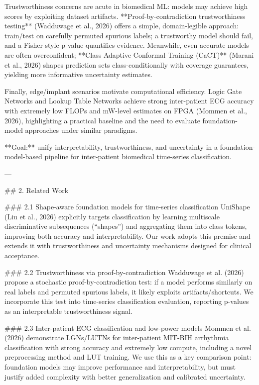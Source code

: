 Trustworthiness concerns are acute in biomedical ML: models may achieve high scores by exploiting dataset artifacts. **Proof-by-contradiction trustworthiness testing** (Wadduwage et al., 2026) offers a simple, domain-legible approach: train/test on carefully permuted spurious labels; a trustworthy model should fail, and a Fisher-style p-value quantifies evidence. Meanwhile, even accurate models are often overconfident; **Class Adaptive Conformal Training (CaCT)** (Marani et al., 2026) shapes prediction sets class-conditionally with coverage guarantees, yielding more informative uncertainty estimates.

Finally, edge/implant scenarios motivate computational efficiency. Logic Gate Networks and Lookup Table Networks achieve strong inter-patient ECG accuracy with extremely low FLOPs and mW-level estimates on FPGA (Mommen et al., 2026), highlighting a practical baseline and the need to evaluate foundation-model approaches under similar paradigms.

**Goal:** unify interpretability, trustworthiness, and uncertainty in a foundation-model-based pipeline for inter-patient biomedical time-series classification.

---

## 2. Related Work  

### 2.1 Shape-aware foundation models for time-series classification  
UniShape (Liu et al., 2026) explicitly targets classification by learning multiscale discriminative subsequences (“shapes”) and aggregating them into class tokens, improving both accuracy and interpretability. Our work adopts this premise and extends it with trustworthiness and uncertainty mechanisms designed for clinical acceptance.

### 2.2 Trustworthiness via proof-by-contradiction  
Wadduwage et al. (2026) propose a stochastic proof-by-contradiction test: if a model performs similarly on real labels and permuted spurious labels, it likely exploits artifacts/shortcuts. We incorporate this test into time-series classification evaluation, reporting p-values as an interpretable trustworthiness signal.

### 2.3 Inter-patient ECG classification and low-power models  
Mommen et al. (2026) demonstrate LGNs/LUTNs for inter-patient MIT-BIH arrhythmia classification with strong accuracy and extremely low compute, including a novel preprocessing method and LUT training. We use this as a key comparison point: foundation models may improve performance and interpretability, but must justify added complexity with better generalization and calibrated uncertainty.


